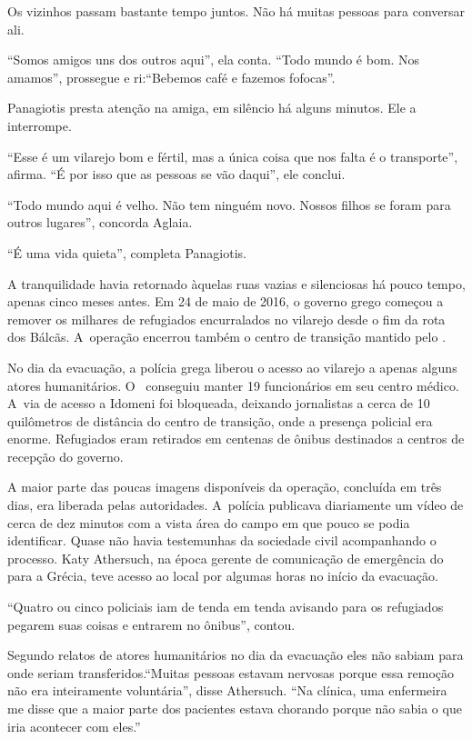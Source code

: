 Os vizinhos passam bastante tempo juntos. Não há muitas pessoas para
conversar ali.

``Somos amigos uns dos outros aqui'', ela conta. ``Todo mundo é bom. Nos
amamos'', prossegue e ri:``Bebemos café e fazemos fofocas''.

Panagiotis presta atenção na amiga, em silêncio há alguns minutos. Ele a
interrompe.

``Esse é um vilarejo bom e fértil, mas a única coisa que nos falta é o
transporte'', afirma. ``É por isso que as pessoas se vão daqui'',
ele conclui.

``Todo mundo aqui é velho. Não tem ninguém novo. Nossos filhos se foram
para outros lugares'', concorda Aglaia.

``É uma vida quieta'', completa Panagiotis.

A tranquilidade havia retornado àquelas ruas vazias e silenciosas há
pouco tempo, apenas cinco meses antes. Em 24 de maio de 2016, o governo
grego começou a remover os milhares de refugiados encurralados no
vilarejo desde o fim da rota dos Bálcãs. A~operação encerrou também o
centro de transição mantido pelo .

No dia da evacuação, a polícia grega liberou o acesso ao vilarejo a
apenas alguns atores humanitários. O~ conseguiu manter 19
funcionários em seu centro médico. A~via de acesso a Idomeni foi
bloqueada, deixando jornalistas a cerca de 10 quilômetros de distância
do centro de transição, onde a presença policial era enorme. Refugiados
eram retirados em centenas de ônibus destinados a centros de recepção do
governo.

A maior parte das poucas imagens disponíveis da operação, concluída em
três dias, era liberada pelas autoridades. A~polícia publicava
diariamente um vídeo de cerca de dez minutos com a vista área do campo
em que pouco se podia identificar. Quase não havia testemunhas da
sociedade civil acompanhando o processo. Katy Athersuch, na época gerente
de comunicação de emergência do  para a Grécia, teve acesso ao local
por algumas horas no início da evacuação.

``Quatro ou cinco policiais iam de tenda em tenda avisando para os
refugiados pegarem suas coisas e entrarem no ônibus'', contou.

Segundo relatos de atores humanitários no dia da evacuação eles não sabiam para onde seriam 
transferidos.``Muitas pessoas estavam nervosas
porque essa remoção não era inteiramente voluntária'', disse Athersuch.
``Na clínica, uma enfermeira me disse que a maior parte dos pacientes
estava chorando porque não sabia o que iria acontecer com eles.''

